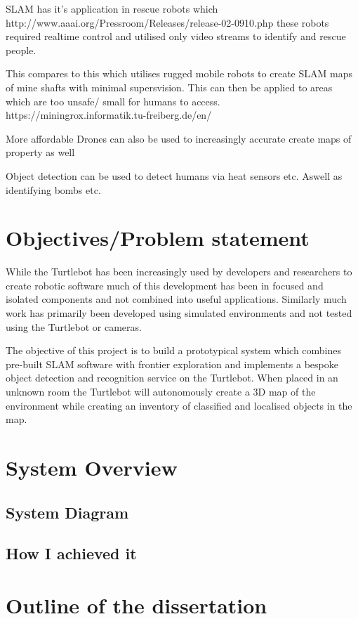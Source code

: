 \documentclass{mproj}
\begin{document}
SLAM has it's application in rescue robots which
http://www.aaai.org/Pressroom/Releases/release-02-0910.php
these robots required realtime control and utilised only video streams to identify and rescue people.

This compares to this which utilises rugged mobile robots to create SLAM maps of mine shafts with minimal supersvision. This can then be applied to areas which are too unsafe/ small for humans to access.
https://miningrox.informatik.tu-freiberg.de/en/

More affordable Drones can also be used to increasingly accurate create maps of property as well

Object detection can be used to detect humans via heat sensors etc. Aswell as identifying bombs etc.



\section{Objectives/Problem statement}

While the Turtlebot has been increasingly used by developers and researchers to create robotic software much of this development has been in focused and isolated components and not combined into useful applications. Similarly much work has primarily been developed using simulated environments and not tested using the Turtlebot or cameras.

The objective of this project is to build a prototypical system which combines pre-built SLAM software with frontier exploration and implements a bespoke object detection and recognition service on the Turtlebot. When placed in an unknown room the Turtlebot will autonomously create a 3D map of the environment while creating an inventory of classified and localised objects in the map.

\section{System Overview} 

\subsection{System Diagram} 
\subsection{How I achieved it}

\section{Outline of the dissertation} 
\end{document}
